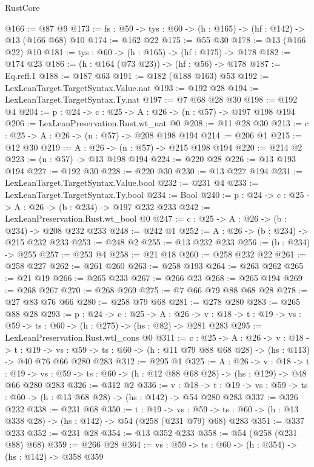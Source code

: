 \begin{lexlean}{RustCore}
\begin{coremodule}
@166 := @87 @9
@173 := {fs : @59} -> {tys : @60} -> (h : @165) -> (hf : @142) -> @13 (@166 @68) @10
@174 := @162 @22
@175 := @55 @30
@178 := @13 (@166 @22) @10
@181 := {tys : @60} -> (h : @165) -> (hf : @175) -> @178
@182 := @174 @23
@186 := (h : @164 (@73 @23)) -> (hf : @56) -> @178
@187 := Eq.refl.{1}
@188 := @187 @63
@191 := @182 (@188 @163) @53
@192 := LexLeanTarget.TargetSyntax.Value.nat
@193 := @192 @28
@194 := LexLeanTarget.TargetSyntax.Ty.nat
@197 := @7 @68 @28 @30
@198 := @192 @4
@204 := {p : @24} -> {c : @25} -> {A : @26} -> (n : @57) -> @197 @198 @194
@206 := LexLeanPreservation.Rust.wt_nat @0
@208 := @11 @28 @30
@213 := {c : @25} -> {A : @26} -> (n : @57) -> @208 @198 @194
@214 := @206 @1
@215 := @12 @30
@219 := {A : @26} -> (n : @57) -> @215 @198 @194
@220 := @214 @2
@223 := (n : @57) -> @13 @198 @194
@224 := @220 @28
@226 := @13 @193 @194
@227 := @192 @30
@228 := @220 @30
@230 := @13 @227 @194
@231 := LexLeanTarget.TargetSyntax.Value.bool
@232 := @231 @4
@233 := LexLeanTarget.TargetSyntax.Ty.bool
@234 := Bool
@240 := {p : @24} -> {c : @25} -> {A : @26} -> (b : @234) -> @197 @232 @233
@242 := LexLeanPreservation.Rust.wt_bool @0
@247 := {c : @25} -> {A : @26} -> (b : @234) -> @208 @232 @233
@248 := @242 @1
@252 := {A : @26} -> (b : @234) -> @215 @232 @233
@253 := @248 @2
@255 := @13 @232 @233
@256 := (b : @234) -> @255
@257 := @253 @4
@258 := @21 @18
@260 := @258 @232 @22
@261 := @258 @227
@262 := @261 @260
@263 := @258 @193
@264 := @263 @262
@265 := @21 @19
@266 := @265 @233
@267 := @266 @23
@268 := @265 @194
@269 := @268 @267
@270 := @268 @269
@275 := @7 @66 @79 @88 @68 @28
@278 := @27 @83 @76 @66
@280 := @258 @79 @68
@281 := @278 @280
@283 := @265 @88 @28
@293 := {p : @24} ->
  {c : @25} ->
  {A : @26} ->
  {v : @18} -> {t : @19} -> {vs : @59} -> {ts : @60} -> (h : @275) -> (hs : @82) -> @281 @283
@295 := LexLeanPreservation.Rust.wtl_cons @0
@311 := {c : @25} ->
  {A : @26} ->
  {v : @18} ->
  {t : @19} ->
  {vs : @59} -> {ts : @60} -> (h : @11 @79 @88 @68 @28) -> (hs : @113) -> @40 @76 @66 @280 @283
@312 := @295 @1
@325 := {A : @26} ->
  {v : @18} ->
  {t : @19} -> {vs : @59} -> {ts : @60} -> (h : @12 @88 @68 @28) -> (hs : @129) -> @48 @66 @280 @283
@326 := @312 @2
@336 := {v : @18} ->
  {t : @19} -> {vs : @59} -> {ts : @60} -> (h : @13 @68 @28) -> (hs : @142) -> @54 @280 @283
@337 := @326 @232
@338 := @231 @68
@350 := {t : @19} ->
  {vs : @59} -> {ts : @60} -> (h : @13 @338 @28) -> (hs : @142) -> @54 (@258 (@231 @79) @68) @283
@351 := @337 @233
@352 := @231 @28
@354 := @13 @352 @233
@358 := @54 (@258 (@231 @88) @68)
@359 := @266 @28
@364 := {vs : @59} -> {ts : @60} -> (h : @354) -> (hs : @142) -> @358 @359

\end{coremodule}
\end{lexlean}
